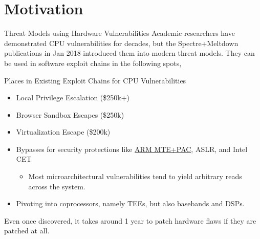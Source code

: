 \section{Motivation}
\frame{\sectionpage}

\begin{frame}{Threat Models using Hardware Vulnerabilities}
    Academic researchers have demonstrated CPU vulnerabilities for decades, but the Spectre+Meltdown publications in Jan 2018 introduced them into modern threat models. They can be used in software exploit chains in the following spots,
    \begin{block}{Places in Existing Exploit Chains for CPU Vulnerabilities}
        \begin{itemize}
            \item Local Privilege Escalation (\$250k+)
            \item Browser Sandbox Escapes (\$250k)
            \item Virtualization Escape (\$200k)
            \item Bypasses for security protections like \href{https://arxiv.org/abs/2406.08719}{\color{pink}ARM MTE+PAC}, ASLR, and Intel CET
            \begin{itemize}
                \item Most microarchitectural vulnerabilities tend to yield arbitrary reads across the system.
            \end{itemize}
            \item Pivoting into coprocessors, namely TEEs, but also basebands and DSPs.
       \end{itemize}
    \end{block}
    Even once discovered, it takes around 1 year to patch hardware flaws if they are patched at all. 
\end{frame}

